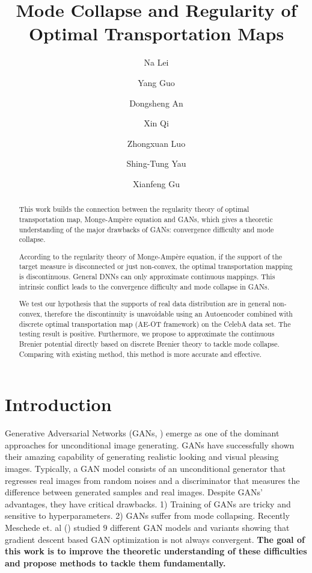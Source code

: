 \documentclass{article}
\title{Mode Collapse and Regularity of Optimal Transportation Maps}
\author[1]{Na Lei}
\author[2]{Yang Guo}
\author[2]{Dongsheng An}
\author[2]{Xin Qi}
\author[1]{Zhongxuan Luo}
\author[3]{Shing-Tung Yau}
\author[2]{Xianfeng Gu}
\affil[1]{School of Software and Technology, Dalian University of Technology}
\affil[2]{Department of Computer Science, Stony Brook University}
\affil[3]{Department of Mathematics, Harvard University}
\begin{document}
\maketitle
\begin{abstract}%
 This work builds the connection between the regularity theory of optimal transportation map, Monge-Amp\`{e}re equation and GANs, which gives a theoretic understanding of the major drawbacks of GANs: convergence difficulty and mode collapse.

According to the regularity theory of Monge-Amp\`{e}re equation, if the support of the target measure is disconnected or just non-convex, the optimal transportation mapping is discontinuous. General DNNs can only approximate continuous mappings. This intrinsic conflict leads to the convergence difficulty and mode collapse in GANs.

We test our hypothesis that the supports of real data distribution are in general non-convex, therefore the discontinuity is unavoidable using an Autoencoder combined with discrete optimal transportation map (AE-OT framework) on the CelebA data set. The testing result is positive. Furthermore, we propose to approximate the continuous Brenier potential directly based on discrete Brenier theory to tackle mode collapse. Comparing with existing method, this method is more accurate and effective.
\end{abstract}



\section{Introduction}
Generative Adversarial Networks (GANs, \cite{goodfellow2014generative}) emerge as one of the dominant approaches for unconditional image generating. GANs have successfully shown their amazing capability of generating realistic looking and visual pleasing images. Typically, a GAN model consists of an unconditional generator that regresses real images from random noises and a discriminator that measures the difference between generated samples and real images. Despite GANs' advantages, they have critical drawbacks. 1) Training of GANs are tricky and sensitive to hyperparameters. 2) GANs suffer from mode collapsing. Recently Meschede et. al (\cite{mescheder2018training}) studied $9$ different GAN models and variants showing that gradient descent based GAN optimization is not always convergent. \textbf{The goal of this work is to improve the theoretic understanding of these difficulties and propose methods to tackle them fundamentally.}
\end{document}
